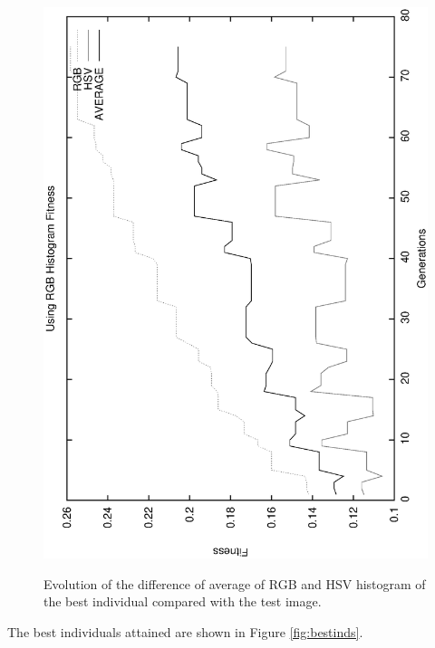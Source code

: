 \documentclass[conference]{IEEEtran}
\begin{document}
\begin{figure}
   \includegraphics[scale =0.4] {images/rgbgens.eps}
\label{fig:gensrgb}
\caption{Evolution of the difference of average of RGB and HSV histogram of the best individual compared with the test image. }
\end{figure}

The best individuals attained are shown in Figure \ref{fig:bestinds}.
\end{document}
